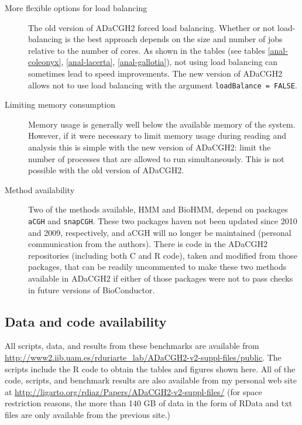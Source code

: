 \documentclass[a4paper,11pt]{article}
\begin{document}
\begin{description}
\item[More flexible options for load balancing] The old version of ADaCGH2
  forced load balancing. Whether or not load-balancing is the best
  approach depends on the size and number of jobs relative to the number
  of cores. As shown in the tables (see tables \ref{anal-coleonyx},
  \ref{anal-lacerta}, \ref{anal-gallotia}), not using load balancing can
  sometimes lead to speed improvements. The new version of ADaCGH2 allows
  not to use load balancing with the argument \texttt{loadBalance = FALSE}.

\item[Limiting memory consumption] Memory usage is generally well below
  the available memory of the system. However, if it were necessary to
  limit memory usage during reading and analysis this is simple with the
  new version of ADaCGH2: limit the number of processes that are allowed
  to run simultaneously. This is not possible with the old version of
  ADaCGH2.

\item[Method availability] Two of the methods available, HMM and BioHMM,
  depend on packages \texttt{aCGH} and \texttt{snapCGH}. These two
  packages haven not been updated since 2010 and 2009, respectively, and
  aCGH will no longer be maintained (personal communication from the
  authors). There is code in the ADaCGH2 repositories (including both C
  and R code), taken and modified from those packages, that can be readily
  uncommented to make these two methods available in ADaCGH2 if either of
  those packages were not to pass checks in future versions of
  BioConductor.
 
\end{description}



\subsection{Data and code availability}

All scripts, data, and results from these benchmarks are available from
\url{http://www2.iib.uam.es/rduriarte\_lab/ADaCGH2-v2-suppl-files/public}. The
scripts include the R code to obtain the tables and figures shown
here. All of the code, scripts, and benchmark results are also available
from my personal web site at
\url{http://ligarto.org/rdiaz/Papers/ADaCGH2-v2-suppl-files/} (for space
restriction reasons, the more than 140 GB of data in the form of RData and
txt files are only available from the previous site.)
\end{document}
